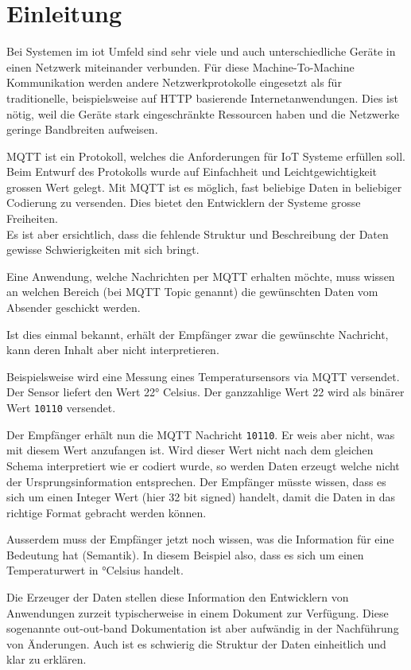 \chapter{Einleitung}
\label{chap:einleitung}

Bei Systemen im \acrfull{iot} Umfeld sind sehr viele und auch unterschiedliche Geräte in einen Netzwerk miteinander verbunden. 
Für diese Machine-To-Machine Kommunikation werden andere Netzwerkprotokolle eingesetzt als für traditionelle, beispielsweise auf HTTP basierende Internetanwendungen. Dies ist nötig, weil die Geräte stark eingeschränkte Ressourcen haben und die Netzwerke geringe Bandbreiten aufweisen.

MQTT ist ein Protokoll, welches die Anforderungen für IoT Systeme erfüllen soll. Beim Entwurf des Protokolls wurde auf Einfachheit und Leichtgewichtigkeit grossen Wert gelegt. Mit MQTT ist es möglich, fast beliebige Daten in beliebiger Codierung zu versenden. Dies bietet den Entwicklern der Systeme grosse Freiheiten. \\
Es ist aber ersichtlich, dass die fehlende Struktur und Beschreibung der Daten gewisse Schwierigkeiten mit sich bringt. 

Eine Anwendung, welche Nachrichten per MQTT erhalten möchte, muss wissen an welchen Bereich (bei MQTT Topic genannt) die gewünschten Daten vom Absender geschickt werden.

Ist dies einmal bekannt, erhält der Empfänger zwar die gewünschte Nachricht, kann deren Inhalt aber nicht interpretieren.

Beispielsweise wird eine Messung eines Temperatursensors via MQTT versendet. Der Sensor liefert den Wert 22° Celsius.
Der ganzzahlige Wert 22 wird als binärer Wert \texttt{10110} versendet.

Der Empfänger erhält nun die MQTT Nachricht \texttt{10110}. Er weis aber nicht, was mit diesem Wert anzufangen ist. Wird dieser Wert nicht nach dem gleichen Schema interpretiert wie er codiert wurde, so werden Daten erzeugt welche nicht der Ursprungsinformation entsprechen.
Der Empfänger müsste wissen, dass es sich um einen Integer Wert (hier 32 bit signed) handelt, damit die Daten in das richtige Format gebracht werden können.

Ausserdem muss der Empfänger jetzt noch wissen, was die Information für eine Bedeutung hat (Semantik). In diesem Beispiel also, dass es sich um einen Temperaturwert in °Celsius handelt.

Die Erzeuger der Daten stellen diese Information den Entwicklern von Anwendungen zurzeit typischerweise in einem Dokument zur Verfügung. Diese sogenannte out-out-band Dokumentation ist aber aufwändig in der Nachführung von Änderungen. Auch ist es schwierig die Struktur der Daten einheitlich und klar zu erklären.